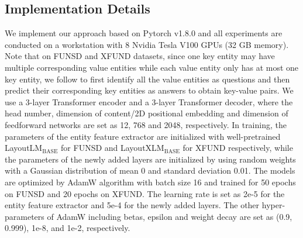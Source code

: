 \documentclass[letterpaper]{article}
\begin{document}
\subsection{Implementation Details}
We implement our approach based on Pytorch v1.8.0 and all experiments are conducted on a workstation with 8 Nvidia Tesla V100 GPUs (32 GB memory). Note that on FUNSD and XFUND datasets, since one key entity may have multiple corresponding value entities while each value entity only has at most one key entity, we follow \cite{zhang2021entity} to first identify all the value entities as questions and then predict their corresponding key entities as answers to obtain key-value pairs. We use a 3-layer Transformer encoder and a 3-layer Transformer decoder, where the head number, dimension of content/2D positional embedding and dimension of feedforward networks are set as 12, 768 and 2048, respectively. In training, the parameters of the entity feature extractor are initialized with well-pretrained LayoutLM$_{\mathrm{BASE}}$ for FUNSD and LayoutXLM$_{\mathrm{BASE}}$ for XFUND respectively, while the parameters of the newly added layers are initialized by using random weights with a Gaussian distribution of mean 0 and standard deviation 0.01. The models are optimized by AdamW \cite{loshchilov2017decoupled} algorithm with batch size 16 and trained for 50 epochs on FUNSD and 20 epochs on XFUND. The learning rate is set as 2e-5 for the entity feature extractor and 5e-4 for the newly added layers. The other hyper-parameters of AdamW including betas, epsilon and weight decay are set as (0.9, 0.999), 1e-8, and 1e-2, respectively.
\end{document}
